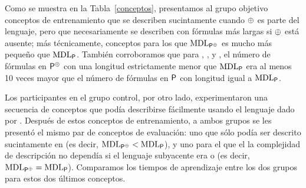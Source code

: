 
Como se muestra en la Tabla~\ref{conceptos}, presentamos al grupo objetivo conceptos de entrenamiento que se describen sucintamente cuando $\oplus$ es parte del lenguaje, pero que necesariamente se describen con fórmulas más largas si $\oplus$ está ausente; más técnicamente, conceptos para los que ${\rm MDL}_{{\sf P}^\oplus}$ es mucho más pequeño que ${\rm MDL}_{{\sf P}}$. También corroboramos que para \targetb, \targetc, \targetd y \testa, el número de fórmulas en ${\sf P}^\oplus$ con una longitud estrictamente menor que ${\rm MDL}_{{\sf P}}$ era al menos 10 veces mayor que el número de fórmulas en ${\sf P}$ con longitud igual a ${\rm MDL}_{{\sf P}}$.


Los participantes en el grupo control, por otro lado, experimentaron una secuencia de conceptos que podía describirse fácilmente usando el lenguaje dado por \grambool. Después de estos conceptos de entrenamiento, a ambos grupos se les presentó el mismo par de conceptos de evaluación: uno que sólo podía ser descrito sucintamente en \gramboolxor (es decir, ${\rm MDL}_{{\sf P}^\oplus}<{\rm MDL}_{{\sf P}}$), y uno para el que el la complejidad de descripción no dependía si el lenguaje subyacente era \gramboolxor o \grambool (es decir, ${\rm MDL}_{{\sf P}^\oplus}={\rm MDL}_{{\sf P}}$). Comparamos los tiempos de aprendizaje entre los dos grupos para estos dos últimos conceptos.



